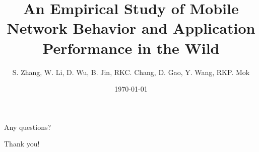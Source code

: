 \documentclass[aspectratio=169]{beamer}
\title{An Empirical Study of Mobile Network Behavior and Application Performance in the Wild}
\author{S. Zhang, W. Li, D. Wu, B. Jin, RKC. Chang, D. Gao, Y. Wang, RKP. Mok}
\institute{Southern University of Science and Technology, China}
\date{\today}
\begin{document}
    \begin{frame}
        \titlepage
    \end{frame}


    
    
    
    

    \appendix

    \begin{frame}
        \centering \huge
        Any questions?
    \end{frame}

    \begin{frame}
        \centering \huge
        Thank you!
    \end{frame}
\end{document}
